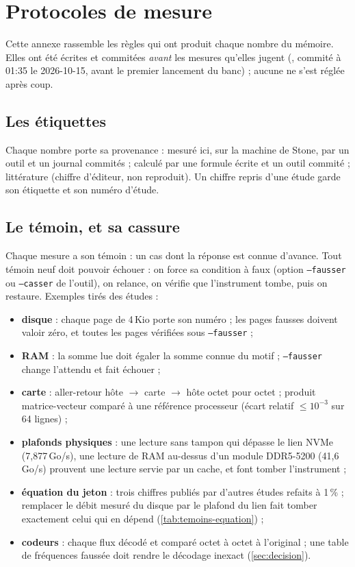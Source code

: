 \chapter{Protocoles de mesure}\label{ann:protocoles}

Cette annexe rassemble les règles qui ont produit chaque nombre \mes{} du mémoire. Elles ont été écrites et commitées \emph{avant} les mesures qu'elles jugent (, commité à 01:35 le 2026-10-15, avant le premier lancement du banc) ; aucune ne s'est réglée après coup.

\section{Les étiquettes}

Chaque nombre porte sa provenance : \mes{} mesuré ici, sur la machine de Stone, par un outil et un journal commités ; \calc{} calculé par une formule écrite et un outil commité ; \litt{} littérature (chiffre d'éditeur, non reproduit). Un chiffre repris d'une étude garde son étiquette et son numéro d'étude.

\section{Le témoin, et sa cassure}\label{sec:protocole-temoin}

Chaque mesure a son témoin : un cas dont la réponse est connue d'avance. Tout témoin neuf doit pouvoir échouer : on force sa condition à faux (option \texttt{--fausser} ou \texttt{--casser} de l'outil), on relance, on vérifie que l'instrument tombe, puis on restaure. Exemples tirés des études :
\begin{itemize}
\item \textbf{disque} : chaque page de 4\,Kio porte son numéro ; les pages fausses doivent valoir zéro, et toutes les pages vérifiées sous \texttt{--fausser} ;
\item \textbf{RAM} : la somme lue doit égaler la somme connue du motif ; \texttt{--fausser} change l'attendu et fait échouer ;
\item \textbf{carte} : aller-retour hôte $\to$ carte $\to$ hôte octet pour octet ; produit matrice-vecteur comparé à une référence processeur (écart relatif $\le 10^{-3}$ sur 64 lignes) ;
\item \textbf{plafonds physiques} : une lecture sans tampon qui dépasse le lien NVMe (7,877\,Go/s), une lecture de RAM au-dessus d'un module DDR5-5200 (41,6\,Go/s) prouvent une lecture servie par un cache, et font tomber l'instrument ;
\item \textbf{équation du jeton} : trois chiffres publiés par d'autres études refaits à 1\,\% ; remplacer le débit mesuré du disque par le plafond du lien fait tomber exactement celui qui en dépend (\cref{tab:temoins-equation}) ;
\item \textbf{codeurs} : chaque flux décodé et comparé octet à octet à l'original ; une table de fréquences faussée doit rendre le décodage inexact (\cref{sec:decision}).
\end{itemize}

